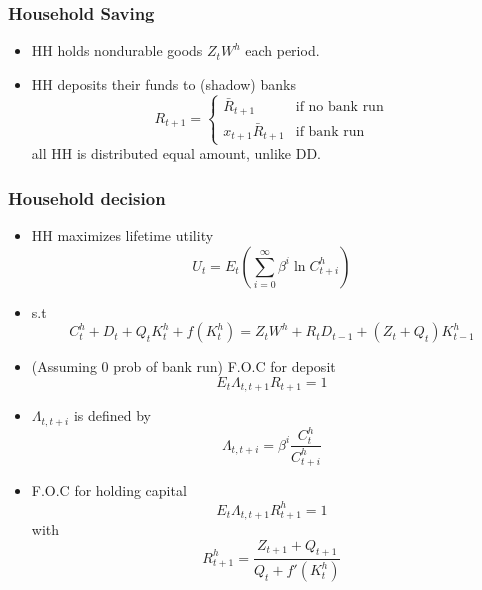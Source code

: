 \begin{frame}
    \frametitle{Household Saving}

    \begin{itemize}
        \item HH holds nondurable goods $Z_t W^h$ each period.
        \item HH deposits their funds to (shadow) banks 
        \begin{equation}
            R_{t+1} = \begin{cases}
                \bar{R}_{t+1} & \text{if no bank run} \\
                x_{t+1}\bar{R}_{t+1} & \text{if bank run}
            \end{cases}
        \end{equation}
        all HH is distributed equal amount, unlike DD.
    \end{itemize}
\end{frame}

\begin{frame}[allowframebreaks]
    \frametitle{Household decision}
    \begin{itemize}
        \item HH maximizes lifetime utility 
        \begin{equation*}
            U_t = E_t \left(\sum_{i=0}^\infty \beta^{i} \ln{C^h_{t+i}}\right)
        \end{equation*}
        \item s.t 
        \begin{equation}
            C^h_t + D_t + Q_t K^h_t + f(K^h_t) = Z_t W^h +  R_t D_{t-1} + (Z_t + Q_t)K^h_{t-1}
        \end{equation}
        \framebreak
        \item (Assuming 0 prob of bank run) F.O.C for deposit
        \begin{equation}
            \label{eq:FOC-deposit}
            E_t \Lambda_{t, t+1}R_{t+1} = 1
        \end{equation}
        \item $\Lambda_{t, t+i}$ is defined by 
        \begin{equation}
            \label{eq:lambda}
            \Lambda_{t, t+i} = \beta^i \frac{C^h_t}{C^h_{t+i}}
        \end{equation}
        \item F.O.C for holding capital 
        \begin{equation}
            \label{eq:FOC-capital}
            E_t \Lambda_{t, t+1}R^h_{t+1} = 1
        \end{equation}
        with 
        \begin{equation}
            \label{eq:Rh}
            R^h_{t+1} = \frac{Z_{t+1} + Q_{t+1}}{Q_t + f'(K^h_t)}
        \end{equation}
    \end{itemize}
\end{frame}

